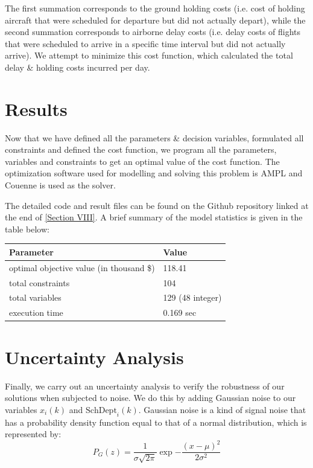 \documentclass[conference]{IEEEtran}
\begin{document}
The first summation corresponds to the ground holding costs (i.e. cost of holding aircraft that were scheduled for departure but did not actually depart), while the second summation corresponds to airborne delay costs (i.e. delay costs of flights that were scheduled to arrive in a specific time interval but did not actually arrive). We attempt to minimize this cost function, which calculated the total delay \& holding costs incurred per day.
\vspace{2mm}

\section{\large Results}
\label{sec:sec5}
\vspace{1mm}

Now that we have defined all the parameters \& decision variables, formulated all constraints and defined the cost function, we program all the parameters, variables and constraints to get an optimal value of the cost function. The optimization software used for modelling and solving this problem is AMPL and Couenne is used as the solver.
\vspace{2mm}

The detailed code and result files can be found on the Github repository linked at the end of \hyperref[sec:sec8]{[Section VIII]}. A brief summary of the model statistics is given in the table below:
\vspace{4mm}

\begin{tabular}{@{}|p{11.36em}|p{11.36em}|@{}}
  \hline
  \textbf{Parameter} & \textbf{Value} \\
  \hline
  optimal objective value (in thousand \$) & 118.41 \\
  \hline
  total constraints & 104 \\
  \hline
  total variables & 129 (48 integer) \\
  \hline
  execution time & 0.169 sec \\
  \hline
\end{tabular}
\vspace{0mm}

\section{\large Uncertainty Analysis}
\label{sec:sec6}
\vspace{1mm}

Finally, we carry out an uncertainty analysis to verify the robustness of our solutions when subjected to noise. We do this by adding Gaussian noise to our variables $x_i(k)$ and $\text{SchDept}_i(k)$. Gaussian noise is a kind of signal noise that has a probability density function equal to that of a normal distribution, which is represented by:
$$P_G(z)=\frac{1}{\sigma\sqrt{2\pi}}\exp{-\frac{(x-\mu)^2}{2\sigma^2}}$$
\vspace{0mm}
\end{document}
